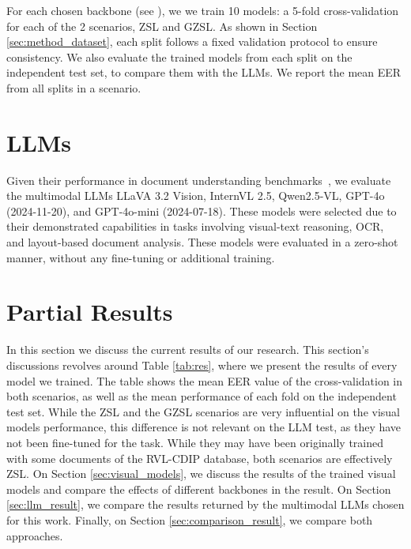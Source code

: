 For each chosen backbone (see ), we we train 10 models: a 5-fold cross-validation for each of the 2 scenarios, \gls{ZSL} and \gls{GZSL}. As shown in Section \ref{sec:method_dataset}, each split follows a fixed validation protocol to ensure consistency. We also evaluate the trained models from each split on the independent test set, to compare them with the \gls{LLM}s. We report the mean \gls{EER} from all splits in a scenario.

\section{LLMs}

Given their performance in document understanding benchmarks~\cite{bai2025qwen2,meta2024llama3.2}, we evaluate the multimodal \glspl{LLM} LLaVA 3.2 Vision, InternVL 2.5, Qwen2.5-VL, GPT-4o (2024-11-20), and GPT-4o-mini (2024-07-18). These models were selected due to their demonstrated capabilities in tasks involving visual-text reasoning, OCR, and layout-based document analysis.
These models were evaluated in a zero-shot manner, without any fine-tuning or additional training.

\section{Partial Results}
\label{sec:results}

In this section we discuss the current results of our research. This section's discussions revolves around Table \ref{tab:res}, where we present the results of every model we trained. The table shows the mean EER value of the cross-validation in both scenarios, as well as the mean performance of each fold on the independent test set. While the \gls{ZSL} and the \gls{GZSL} scenarios are very influential on the visual models performance, this difference is not relevant on the \gls{LLM} test, as they have not been fine-tuned for the task. While they may have been originally trained with some documents of the RVL-CDIP database, both scenarios are effectively \gls{ZSL}. On Section \ref{sec:visual_models}, we discuss the results of the trained visual models and compare the effects of different backbones in the result. On Section \ref{sec:llm_result}, we compare the results returned by the multimodal \glspl{LLM} chosen for this work. Finally, on Section \ref{sec:comparison_result}, we compare both approaches.

